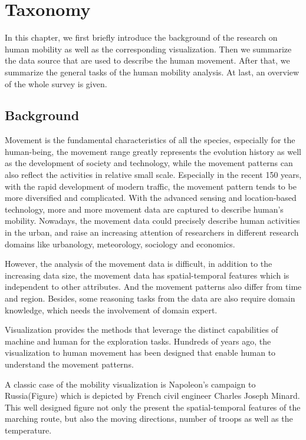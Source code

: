 \chapter{Taxonomy}
\label{chap:intro}

In this chapter, we first briefly introduce the background of the research on human mobility as well as the corresponding visualization. Then we summarize the data source that are used to describe the human movement. After that, we summarize the general tasks of the human mobility analysis. At last, an overview of the whole survey is given.


\section{Background}

Movement is the fundamental characteristics of all the species, especially for the human-being, the movement range greatly represents the evolution history as well as the development of society and technology, while the movement patterns can also reflect the activities in relative small scale. Especially in the recent 150 years, with the rapid development of modern traffic, the movement pattern tends to be more diversified and complicated.  With the advanced sensing and location-based technology, more and more movement data are captured to describe human’s mobility. Nowadays, the movement data could precisely describe human activities in the urban, and raise an increasing attention of researchers in different research domains like urbanology, meteorology, sociology and economics. 

However, the analysis of the movement data is difficult, in addition to the increasing data size, the movement data has spatial-temporal features which is independent to other attributes. And the movement patterns also differ from time and region. Besides, some reasoning tasks from the data are also require domain knowledge, which needs the involvement of domain expert. 

Visualization provides the methods that leverage the distinct capabilities of machine and human for the exploration tasks. Hundreds of years ago, the visualization to human movement has been designed that enable human to understand the movement patterns. 

A classic case of the mobility visualization is Napoleon’s campaign to Russia(Figure) which is depicted by French civil engineer Charles Joseph Minard. This well designed figure not only the present the spatial-temporal features of the marching route, but also the moving directions, number of troops as well as the temperature.  


